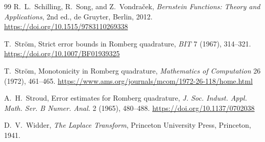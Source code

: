 \documentclass[11pt]{article}
\theoremstyle{definition}
\theoremstyle{remark}
\newcommand{\1}{\mathbf{1}}
\begin{document}
\begin{thebibliography}{99}
R.~L.~Schilling, R.~Song, and Z.~Vondra\v{c}ek,
\emph{Bernstein Functions: Theory and Applications}, 2nd ed.,
de Gruyter, Berlin, 2012.
\url{https://doi.org/10.1515/9783110269338}

T.~Str\"om,
Strict error bounds in Romberg quadrature,
\emph{BIT} 7 (1967), 314--321.
\url{https://doi.org/10.1007/BF01939325}

T.~Str\"om,
Monotonicity in Romberg quadrature,
\emph{Mathematics of Computation} 26 (1972), 461--465.
\url{https://www.ams.org/journals/mcom/1972-26-118/home.html}

A.~H.~Stroud,
Error estimates for Romberg quadrature,
\emph{J. Soc. Indust. Appl. Math. Ser. B Numer. Anal.} 2 (1965), 480--488.
\url{https://doi.org/10.1137/0702038}

D.~V.~Widder,
\emph{The Laplace Transform},
Princeton University Press, Princeton, 1941.

\end{thebibliography}
\end{document}
